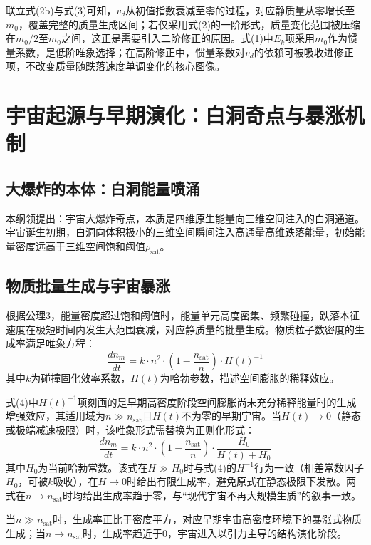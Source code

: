 \documentclass[12pt,a4paper]{ctexart}
\begin{document}
联立式(2b)与式(3)可知，$v_d$从初值指数衰减至零的过程，对应静质量从零增长至$m_0$，覆盖完整的质量生成区间；若仅采用式(2)的一阶形式，质量变化范围被压缩在$m_0/2$至$m_0$之间，这正是需要引入二阶修正的原因。式(1)中$E_k$项采用$m_0$作为惯量系数，是低阶唯象选择；在高阶修正中，惯量系数对$v_d$的依赖可被吸收进修正项，不改变质量随跌落速度单调变化的核心图像。

\section{宇宙起源与早期演化：白洞奇点与暴涨机制}
\subsection{大爆炸的本体：白洞能量喷涌}
本纲领提出：宇宙大爆炸奇点，本质是四维原生能量向三维空间注入的白洞通道。宇宙诞生初期，白洞向体积极小的三维空间瞬间注入高通量高维跌落能量，初始能量密度远高于三维空间饱和阈值$\rho_{\text{sat}}$。

\subsection{物质批量生成与宇宙暴涨}
根据公理3，能量密度超过饱和阈值时，能量单元高度密集、频繁碰撞，跌落本征速度在极短时间内发生大范围衰减，对应静质量的批量生成。物质粒子数密度的生成率满足唯象方程：
\begin{equation}
\frac{dn_m}{dt} = k \cdot n^2 \cdot \left( 1 - \frac{n_{\text{sat}}}{n} \right) \cdot H(t)^{-1}
\end{equation}
其中$k$为碰撞固化效率系数，$H(t)$为哈勃参数，描述空间膨胀的稀释效应\cite{friedmann1922, hubble1929}。

式(4)中$H(t)^{-1}$项刻画的是早期高密度阶段空间膨胀尚未充分稀释能量时的生成增强效应，其适用域为$n \gg n_{\text{sat}}$且$H(t)$不为零的早期宇宙。当$H(t) \to 0$（静态或极端减速极限）时，该唯象形式需替换为正则化形式：
\begin{equation*}
\frac{dn_m}{dt} = k \cdot n^2 \cdot \left( 1 - \frac{n_{\text{sat}}}{n} \right) \cdot \frac{H_0}{H(t) + H_0}
\tag{4b}
\end{equation*}
其中$H_0$为当前哈勃常数。该式在$H \gg H_0$时与式(4)的$H^{-1}$行为一致（相差常数因子$H_0$，可被$k$吸收），在$H \to 0$时给出有限生成率，避免原式在静态极限下发散。两式在$n \to n_{\text{sat}}$时均给出生成率趋于零，与“现代宇宙不再大规模生质”的叙事一致。

当$n \gg n_{\text{sat}}$时，生成率正比于密度平方，对应早期宇宙高密度环境下的暴涨式物质生成；当$n \to n_{\text{sat}}$时，生成率趋近于0，宇宙进入以引力主导的结构演化阶段。
\end{document}
